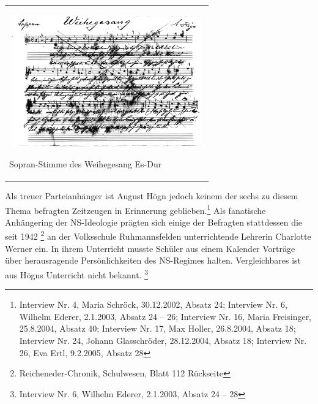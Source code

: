 \begin{center}
\begin{minipage}{8.835cm}
\begin{center}
\tablefirsthead{}
\tablehead{}
\tabletail{}
\tablelasttail{}
\begin{supertabular}{m{8.635cm}}

\includegraphics[width=8.453cm,height=5.678cm]{pictures/zulassungsarbeit-img035.png}

Sopran-Stimme des Weihegesang Es-Dur\\
\end{supertabular}
\end{center}
\end{minipage}
\end{center}

\begin{figure}
\img{}
\caption{}
\end{figure}

Als treuer Parteianhänger ist August Högn jedoch keinem der sechs zu
diesem Thema befragten Zeitzeugen in Erinnerung geblieben.\footnote{
Interview Nr. 4, Maria Schröck, 30.12.2002, Absatz 24; Interview Nr. 6,
Wilhelm Ederer, 2.1.2003, Absatz 24 – 26; Interview Nr. 16, Maria
Freisinger, 25.8.2004, Absatz 40; Interview Nr. 17, Max Holler,
26.8.2004, Absatz 18; Interview Nr. 24, Johann Glasschröder,
28.12.2004, Absatz 18; Interview Nr. 26, Eva Ertl, 9.2.2005, Absatz 28}
Als fanatische Anhängering der NS-Ideologie prägten sich einige der
Befragten stattdessen die seit 1942 \footnote{Reicheneder-Chronik,
Schulwesen, Blatt 112 Rückseite} an der Volksschule Ruhmannsfelden
unterrichtende Lehrerin Charlotte Werner ein. In ihrem Unterricht
musste Schüler aus einem Kalender Vorträge über herausragende
Persönlichkeiten des NS-Regimes halten. Vergleichbares ist aus Högns
Unterricht nicht bekannt. \footnote{Interview Nr. 6, Wilhelm Ederer,
2.1.2003, Absatz 24 – 28}

